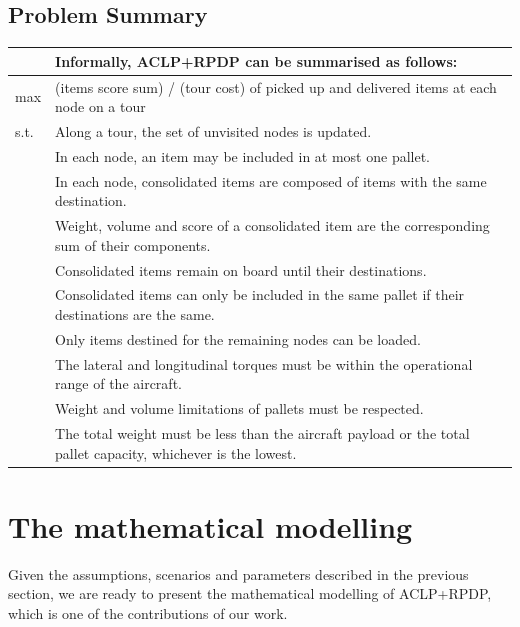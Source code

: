 \documentclass[preprint,authoryear]{elsarticle}
\begin{document}
\subsection{Problem Summary}


\bgroup
\def\arraystretch{1.2}
\begin{table}[H]
	\centering
	\small
	\begin{tabular}{MT}
		&Informally, ACLP+RPDP can be summarised as follows:\\
		\midrule
		max &  (items score sum) / (tour cost) of picked up and delivered items at each node on a tour  \\
		\midrule
s.t.    & Along a tour, the set of unvisited nodes is updated. \\
		& In each node, an item may be included in at most one pallet.\\		
		& In each node, consolidated items are composed of items with the same destination. \\
		& Weight, volume and score of a consolidated item are the corresponding sum of their components.\\
		& Consolidated items remain on board until their destinations.\\	
		& Consolidated items can only be included in the same pallet if their destinations are the same.\\
		& Only items destined for the remaining nodes can be loaded.  \\
		& The lateral and longitudinal torques must be within the operational range of the aircraft.\\
		& Weight and volume limitations of pallets must be respected.\\
		& The total weight must be less than the aircraft payload or the total pallet capacity, whichever is the lowest.\\	
		\midrule
	\end{tabular}
	\normalsize
\end{table}
\egroup 



\section{The mathematical modelling}
\label{sec4}

Given the assumptions, scenarios and parameters described in the previous section, we are ready to present the mathematical modelling of ACLP+RPDP, which is one of the contributions of our work.
\end{document}
